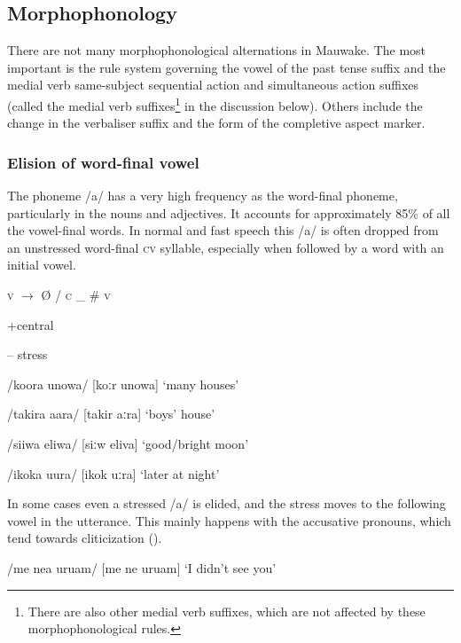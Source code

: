 \subsection{Morphophonology}

There are not many morphophonological alternations in Mauwake.  The most important is the rule system governing the vowel of the past tense suffix and the medial verb same-subject sequential action and simultaneous action suffixes (called the medial verb suffixes\footnote{There are also other medial verb suffixes, which are not  affected by these morphophonological rules.} in the discussion below).  Others include the change in the verbaliser suffix and the form of the completive aspect marker.

\subsubsection{Elision of word-final vowel}

The phoneme /a/ has a very high frequency as the word-final phoneme, particularly in the nouns and adjectives.  It accounts for approximately 85\% of all the vowel-final words.  In normal and fast speech this /a/ is often dropped from an unstressed word-final \textsc{cv} syllable, especially when followed by a word with an initial vowel. 

\textsc{v}    $\rightarrow $    {\O}  /  \textsc{c} \_  \#  \textsc{v}

+central

-- stress

/koora unowa/  [{{\textprimstress}koːr  u{{\textprimstress}}nowa}]  `many houses'

/takira {\textphi}aara/  [ta{{\textprimstress}kir  {{\textprimstress}}}{\textphi}aːra]  `boys' house'

/siiwa eliwa/  [{{\textprimstress}siːw  e{{\textprimstress}}liva}]  `good/bright moon'

/ikoka uura/  [i{{\textprimstress}kok  {{\textprimstress}}uːra}]  `later at night'

In some cases even a stressed /a/ is elided, and the stress moves to the following vowel in the utterance.  This mainly happens with the accusative pronouns, which tend towards cliticization ().

/me ne{\textphi}a uru{\textphi}am/  [{{\textprimstress}me ne}{\textphi} {{\textprimstress}uru}{\textphi}am]  `I didn't see you'

